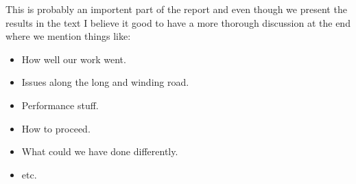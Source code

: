 This is probably an importent part of the report and even though we present the results in the text I believe it good to have a more thorough discussion at the end where we mention things like:

\begin{itemize}
\item How well our work went.
\item Issues along the long and winding road.
\item Performance stuff.
\item How to proceed.
\item What could we have done differently.
\item etc.
\end{itemize}

